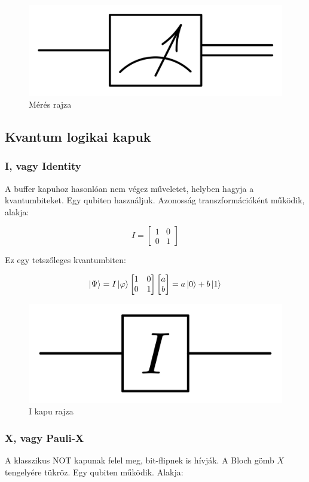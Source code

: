 \documentclass[
]{thesis-ekf}
\theoremstyle{definition}
\theoremstyle{remark}
\begin{document}
\begin{figure}[H]
	\centering
	\includegraphics[width=0.3\linewidth]{measure}
	\caption{Mérés rajza}
	\label{fig:measure}
\end{figure}

\subsection{Kvantum logikai kapuk}\label{kvantumkapuk}

\subsubsection{I, vagy Identity}
A buffer kapuhoz hasonlóan nem végez műveletet, helyben hagyja a kvantumbiteket. Egy qubiten használjuk. Azonosság transzformációként működik, alakja:

\begin{equation}
	I= 
	\begin{bmatrix}
		1 & 0\\
		0 & 1
	\end{bmatrix}
\end{equation}

Ez egy tetszőleges kvantumbiten:

\begin{equation}
	\ket{\Psi}=I\ket{\varphi}
		\begin{bmatrix}
			1 & 0\\
			0 & 1
		\end{bmatrix}
		\begin{bmatrix}
			a\\
			b
		\end{bmatrix}=a\ket{0}+b\ket{1}
\end{equation}


\begin{figure}[H]
	\centering
	\includegraphics[width=0.3\linewidth]{Identity}
	\caption{I kapu rajza}
	\label{fig:identity}
\end{figure}


\subsubsection{X, vagy Pauli-X}
A klasszikus NOT kapunak felel meg, bit-flipnek is hívják. A Bloch gömb $X$ tengelyére tükröz. Egy qubiten működik. Alakja:
\end{document}
